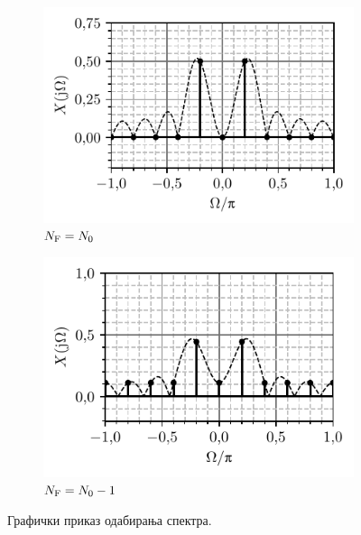 \begin{figure}[ht!]
    \begin{subfigure}{0.49\textwidth}
        \centering
        \includegraphics[scale=1]{fig/sample_X_noleak.pdf}
        \caption{$N_{\rm F} = N_{0}$}
        \label{\ID.fig.a}
    \end{subfigure}
    \begin{subfigure}{0.49\textwidth}
        \centering
        \includegraphics[scale=1]{fig/sample_X_leak.pdf}
        \caption{$N_{\rm F} = N_{0}-1$}
        \label{\ID.fig.b}
    \end{subfigure}
    \caption{Графички приказ одабирања спектра.}
\end{figure}